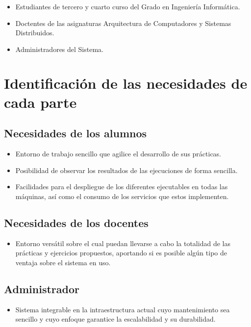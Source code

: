 \begin{itemize}

  \item Estudiantes de tercero y cuarto curso del Grado en Ingeniería Informática.
  \item Doctentes de las asignaturas Arquitectura de Computadores y Sistemas Distribuidos.
  \item Administradores del Sistema.
\end{itemize}

\section{Identificación de las necesidades de cada parte}
\subsection{Necesidades de los alumnos}

\begin{itemize}
  \item Entorno de trabajo sencillo que agilice el desarrollo de sus prácticas.
  \item Posibilidad de observar los resultados de las ejecuciones de forma sencilla.
  \item Facilidades para el despliegue de los diferentes ejecutables en todas las máquinas, así como el consumo de los servicios que estos implementen.
\end{itemize}

\subsection{Necesidades de los docentes}

\begin{itemize}
  \item Entorno versátil sobre el cual puedan llevarse a cabo la totalidad de las prácticas y ejercicios propuestos, aportando si es posible algún tipo de ventaja sobre el sistema en uso.
\end{itemize}

\subsection{Administrador}

\begin{itemize}
  \item Sistema integrable en la intraestructura actual cuyo mantenimiento sea sencillo y cuyo enfoque garantice la escalabilidad y su durabilidad.
\end{itemize}

